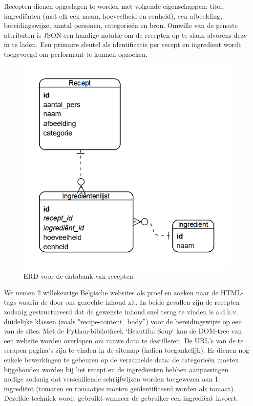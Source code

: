 \documentclass{hogent-article}
\begin{document}
Recepten dienen opgeslagen te worden met volgende eigenschappen: titel, ingrediënten (met elk een naam, hoeveelheid en eenheid), een afbeelding, bereidingswijze, aantal personen, categorieën en bron. Omwille van de geneste attributen is JSON een handige notatie om de recepten op te slaan alvorens deze in te laden. Een primaire sleutel als identificatie per recept en ingrediënt wordt toegevoegd om performant te kunnen opzoeken. \begin{figure}
    \centering
    \includegraphics[width=0.7\linewidth]{../ERD}
    \caption[ERD Databank]{ERD voor de databank van recepten}
    \label{fig:erd}
\end{figure}

We nemen 2 willekeurige Belgische websites als proef en zoeken naar de HTML-tags waarin de door ons gezochte inhoud zit. In beide gevallen zijn de recepten zodanig gestructureerd dat de gewenste inhoud snel terug te vinden is a.d.h.v. duidelijke klassen (zoals "recipe-content\_body'') voor de bereidingswijze op een van de sites. Met de Python-bibliotheek `Beautiful Soup` kan de DOM-tree van een website worden overlopen om rauwe data te destilleren. De URL's van de te scrapen pagina's zijn te vinden in de sitemap (indien toegankelijk).  Er dienen nog enkele bewerkingen te gebeuren op de verzamelde data: de categorieën moeten bijgehouden worden bij het recept en de ingrediënten hebben aanpassingen nodige zodanig dat verschillende schrijfwijzen worden toegewezen aan 1 ingrediënt (tomaten en tomaatjes moeten geïdentificeerd worden als tomaat). Dezelfde techniek wordt gebruikt wanneer de gebruiker een ingrediënt invoert.
\end{document}
